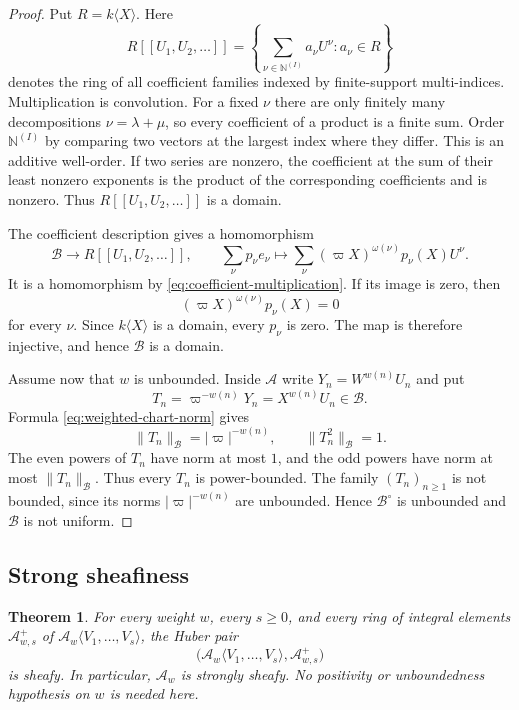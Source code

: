 \documentclass[11pt,reqno]{amsart}
\newtheorem{theorem}{Theorem}[section]
\theoremstyle{definition}
\begin{document}
\begin{proof}
Put $R=k\langle X\rangle$.  Here
\[
  R[[U_1,U_2,\ldots]]
  =\left\{\sum_{\nu\in\mathbb N^{(I)}}a_\nu U^\nu:a_\nu\in R\right\}
\]
denotes the ring of all coefficient families indexed by finite-support
multi-indices.  Multiplication is convolution.  For a fixed $\nu$ there are
only finitely many decompositions $\nu=\lambda+\mu$, so every coefficient of
a product is a finite sum.  Order $\mathbb N^{(I)}$ by comparing two vectors
at the largest index where they differ.  This is an additive well-order.  If
two series are nonzero, the coefficient at the sum of their least nonzero
exponents is the product of the corresponding coefficients and is nonzero.
Thus $R[[U_1,U_2,\ldots]]$ is a domain.

The coefficient description gives a homomorphism
\[
  \mathcal B\longrightarrow
  R[[U_1,U_2,\ldots]],
  \qquad
  \sum_\nu p_\nu e_\nu\longmapsto
  \sum_\nu(\varpi X)^{\omega(\nu)}p_\nu(X)U^\nu.
\]
It is a homomorphism by \eqref{eq:coefficient-multiplication}.  If its image
is zero, then
\[
  (\varpi X)^{\omega(\nu)}p_\nu(X)=0
\]
for every $\nu$.  Since $k\langle X\rangle$ is a domain, every
$p_\nu$ is zero.  The map is therefore injective, and hence $\mathcal B$ is
a domain.

Assume now that $w$ is unbounded.  Inside $\mathcal A$ write
$Y_n=W^{w(n)}U_n$ and put
\[
  T_n=\varpi^{-w(n)}Y_n=X^{w(n)}U_n\in\mathcal B.
\]
Formula \eqref{eq:weighted-chart-norm} gives
\[
  \lVert T_n\rVert_{\mathcal B}=|\varpi|^{-w(n)},
  \qquad
  \lVert T_n^2\rVert_{\mathcal B}=1.
\]
The even powers of $T_n$ have norm at most $1$, and the odd powers have
norm at most $\lVert T_n\rVert_{\mathcal B}$.  Thus every $T_n$ is
power-bounded.  The family $(T_n)_{n\geq1}$ is not bounded, since its norms
$|\varpi|^{-w(n)}$ are unbounded.  Hence
$\mathcal B^\circ$ is unbounded and $\mathcal B$ is not uniform.
\end{proof}

\subsection{Strong sheafiness}

\begin{theorem}\label{thm:parity-sheafy}
For every weight $w$, every $s\geq0$, and every ring of integral elements
$\mathcal A_{w,s}^+$ of
$\mathcal A_w\langle V_1,\ldots,V_s\rangle$, the Huber pair
\[
  \bigl(\mathcal A_w\langle V_1,\ldots,V_s\rangle,
        \mathcal A_{w,s}^+\bigr)
\]
is sheafy.  In particular, $\mathcal A_w$ is strongly sheafy.  No positivity
or unboundedness hypothesis on $w$ is needed here.
\end{theorem}
\end{document}
